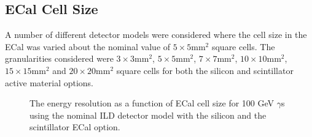 
\subsection{ECal Cell Size}
\label{sec:ecalcells}
A number of different detector models were considered where the cell size in the ECal was varied about the nominal value of $5 \times 5 \text{mm}^{2}$ square cells.  The granularities considered were $3 \times 3 \text{mm}^{2}$, $5 \times 5 \text{mm}^{2}$, $7 \times 7 \text{mm}^{2}$, $10 \times 10 \text{mm}^{2}$, $15 \times 15 \text{mm}^{2}$ and $20 \times 20 \text{mm}^{2}$ square cells for both the silicon and scintillator active material options.  

\begin{figure}
\centering
{}
\caption[The energy resolution as a function of ECal cell size for 100 GeV $\gamma$s using the nominal ILD detector model with \protect{} the silicon and \protect{} the scintillator ECal option.]{The energy resolution as a function of ECal cell size for 100 GeV $\gamma$s using the nominal ILD detector model with \protect{} the silicon and \protect{} the scintillator ECal option.}
\label{fig:ecalcellsizegamma}
\end{figure}

